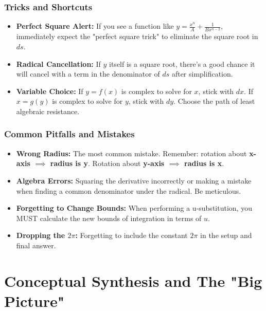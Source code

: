 \documentclass{article}
\begin{document}
\section{Tricks and Shortcuts}
\begin{itemize}
    \item \textbf{Perfect Square Alert:} If you see a function like \(y = \frac{x^n}{A} + \frac{1}{B x^{n-2}}\), immediately expect the "perfect square trick" to eliminate the square root in \(ds\).
    \item \textbf{Radical Cancellation:} If \(y\) itself is a square root, there's a good chance it will cancel with a term in the denominator of \(ds\) after simplification.
    \item \textbf{Variable Choice:} If \(y=f(x)\) is complex to solve for \(x\), stick with \(dx\). If \(x=g(y)\) is complex to solve for \(y\), stick with \(dy\). Choose the path of least algebraic resistance.
\end{itemize}

\section{Common Pitfalls and Mistakes}
\begin{itemize}
    \item \textbf{Wrong Radius:} The most common mistake. Remember: rotation about \textbf{x-axis \(\implies\) radius is y}. Rotation about \textbf{y-axis \(\implies\) radius is x}.
    \item \textbf{Algebra Errors:} Squaring the derivative incorrectly or making a mistake when finding a common denominator under the radical. Be meticulous.
    \item \textbf{Forgetting to Change Bounds:} When performing a u-substitution, you MUST calculate the new bounds of integration in terms of \(u\).
    \item \textbf{Dropping the \(2\pi\):} Forgetting to include the constant \(2\pi\) in the setup and final answer.
\end{itemize}

\part*{Conceptual Synthesis and The "Big Picture"}
\end{document}
